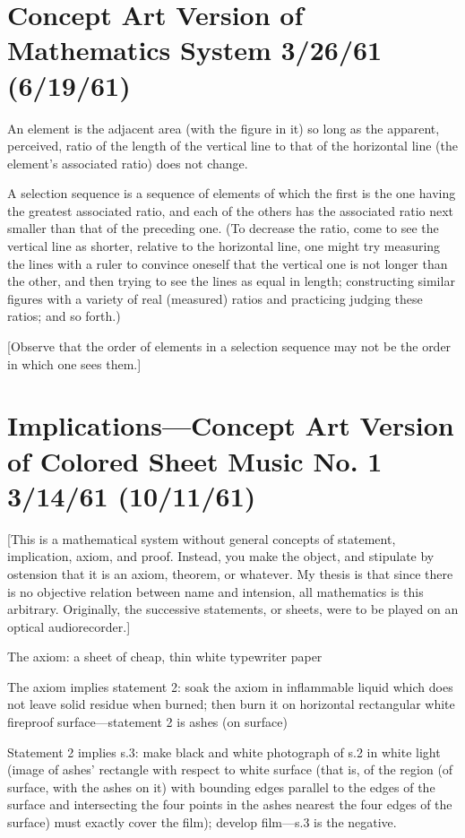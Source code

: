 \documentclass[10pt,twoside]{memoir}
\begin{document}
\begin{enumerate}
{\begin{enumerate}
\begin{sysrules}
\begin{sysrules}
\begin{sysrules}
\begin{sysrules}
{\begin{enumerate}
\section*{Concept Art Version of Mathematics System 3/26/61 (6/19/61)}

An element is the adjacent area (with the figure in it) so long as the 
apparent, perceived, ratio of the length of the vertical line to that of the 
horizontal line (the element's associated ratio) does not change. 

A selection sequence is a sequence of elements of which the first is the one 
having the greatest associated ratio, and each of the others has the associated 
ratio next smaller than that of the preceding one. (To decrease the ratio, 
come to see the vertical line as shorter, relative to the horizontal line, one 
might try measuring the lines with a ruler to convince oneself that the 
vertical one is not longer than the other, and then trying to see the lines as 
equal in length; constructing similar figures with a variety of real (measured) 
ratios and practicing judging these ratios; and so forth.) 

[Observe that the order of elements in a selection sequence may not be the 
order in which one sees them.] 



\section*{Implications---Concept Art Version of Colored Sheet Music No. 1 3/14/61 (10/11/61)}

[This is a mathematical system without general concepts of statement, 
implication, axiom, and proof. Instead, you make the object, and stipulate 
by ostension that it is an axiom, theorem, or whatever. My thesis is that 
since there is no objective relation between name and intension, all 
mathematics is this arbitrary. Originally, the successive statements, or sheets, 
were to be played on an optical audiorecorder.]

\begin{sysrules}
The axiom: a sheet of cheap, thin white typewriter paper 

The axiom implies statement 2: soak the axiom in inflammable liquid which 
does not leave solid residue when burned; then burn it on horizontal 
rectangular white fireproof surface---statement 2 is ashes (on surface) 

Statement 2 implies s.3: make black and white photograph of s.2 in white 
light (image of ashes' rectangle with respect to white surface (that is, of the 
region (of surface, with the ashes on it) with bounding edges parallel to the 
edges of the surface and intersecting the four points in the ashes nearest the 
four edges of the surface) must exactly cover the film); develop film---s.3 is 
the negative.


\end{sysrules}
\end{enumerate}}
\end{sysrules}
\end{sysrules}
\end{sysrules}
\end{sysrules}
\end{enumerate}}
\end{enumerate}
\end{document}
